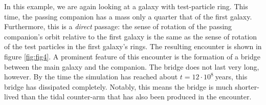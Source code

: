 \documentclass[11pt,twocolumn]{article}
\begin{document}
        In this example, we are again looking at a galaxy with test-particle ring. This time, the passing companion has a mass only a quarter that of the first galaxy. Furthermore, this is a \textit{direct} passage: the sense of rotation of the passing companion's orbit relative to the first galaxy is the same as the sense of rotation of the test particles in the first galaxy's rings. The resulting encounter is shown in figure \ref{fig:fig4}. A prominent feature of this encounter is the formation of a bridge between the main galaxy and the companion. The bridge does not last very long, however. By the time the simulation has reached about $t=12\cdot 10^8\:$years, this bridge has dissipated completely. Notably, this means the bridge is much shorter-lived than the tidal counter-arm that has also been produced in the encounter.          %
        
\end{document}
